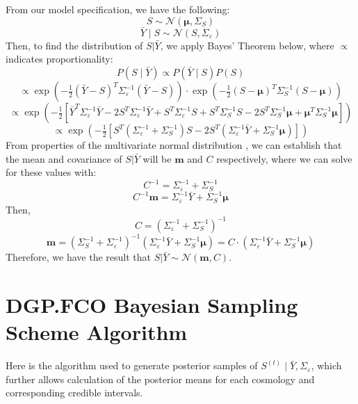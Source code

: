 \documentclass[11pt]{article}
\begin{document}
From our model specification, we have the following:
\[
S \sim \mathcal{N}(\boldsymbol{\mu}, \Sigma_S)
\]
\[
\bar{Y} \mid S \sim \mathcal{N}(S, \Sigma_\varepsilon)
\]
Then, to find the distribution of $S|\bar{Y}$, we apply Bayes' Theorem below, 
where $\propto$ indicates proportionality:
\[
P(S \mid \bar{Y}) \propto P(\bar{Y} \mid S) P(S)
\]
\[
\propto \exp\left(-\tfrac{1}{2} (\bar{Y} - S)^T \Sigma_\varepsilon^{-1} (\bar{Y} - S) \right) 
\cdot \exp\left(-\tfrac{1}{2} (S - \boldsymbol{\mu})^T \Sigma_S^{-1} (S - \boldsymbol{\mu})\right)
\]
\[
\propto \exp\left(-\tfrac{1}{2} \left[ \bar{Y}^T \Sigma_\varepsilon^{-1} \bar{Y} 
- 2 S^T \Sigma_\varepsilon^{-1} \bar{Y} + S^T \Sigma_\varepsilon^{-1} S + S^T \Sigma_S^{-1} S 
- 2 S^T \Sigma_S^{-1} \boldsymbol{\mu} + \boldsymbol{\mu}^T \Sigma_S^{-1} \boldsymbol{\mu} \right] \right)
\]
\[
\propto \exp\left( -\tfrac{1}{2} \left[ S^T (\Sigma_\varepsilon^{-1} + \Sigma_S^{-1}) S 
- 2 S^T (\Sigma_\varepsilon^{-1} \bar{Y} + \Sigma_S^{-1} \boldsymbol{\mu}) \right] \right)
\]
From properties of the multivariate normal distribution \citep[e.g., Equation 7.1 of][]{hoff2009first},
we can establish that the mean and covariance of $S|\bar{Y}$ will be $\boldsymbol{m}$
and $C$ respectively, where we can solve for these values with:
\[
C^{-1} = \Sigma_\varepsilon^{-1} + \Sigma_S^{-1}
\]
\[
C^{-1} \boldsymbol{m} = \Sigma_\varepsilon^{-1} \bar{Y} + \Sigma_S^{-1} \boldsymbol{\mu}
\]
Then,
\[
C = (\Sigma_\varepsilon^{-1} + \Sigma_S^{-1})^{-1}
\]
\[
\boldsymbol{m} = \left( \Sigma_S^{-1} + \Sigma_\varepsilon^{-1} \right)^{-1} 
\left( \Sigma_\varepsilon^{-1} \bar{Y} + \Sigma_S^{-1} \boldsymbol{\mu} \right)
= C \cdot \left( \Sigma_\varepsilon^{-1} \bar{Y} + \Sigma_S^{-1} \boldsymbol{\mu} \right)
\]
Therefore, we have the result that $S|\bar{Y} \sim \mathcal{N}(\boldsymbol{m}, C)$.

\section{DGP.FCO Bayesian Sampling Scheme Algorithm}
\label{sec:apdx_algo}

Here is the algorithm used to generate posterior samples of $S^{(t)} \mid \bar{Y}, 
\Sigma_\varepsilon$, which further allows calculation of the posterior means for each cosmology 
and corresponding credible intervals.

\hspace{5mm}
\end{document}

